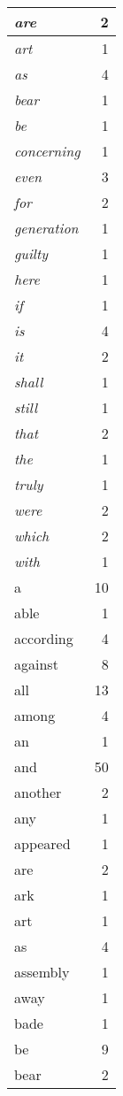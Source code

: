 \begin{center}
\begin{longtable}{l|r}
\emph{are} & 2 \\ \hline
\emph{art} & 1 \\ \hline
\emph{as} & 4 \\ \hline
\emph{bear} & 1 \\ \hline
\emph{be} & 1 \\ \hline
\emph{concerning} & 1 \\ \hline
\emph{even} & 3 \\ \hline
\emph{for} & 2 \\ \hline
\emph{generation} & 1 \\ \hline
\emph{guilty} & 1 \\ \hline
\emph{here} & 1 \\ \hline
\emph{if} & 1 \\ \hline
\emph{is} & 4 \\ \hline
\emph{it} & 2 \\ \hline
\emph{shall} & 1 \\ \hline
\emph{still} & 1 \\ \hline
\emph{that} & 2 \\ \hline
\emph{the} & 1 \\ \hline
\emph{truly} & 1 \\ \hline
\emph{were} & 2 \\ \hline
\emph{which} & 2 \\ \hline
\emph{with} & 1 \\ \hline
a & 10 \\ \hline
able & 1 \\ \hline
according & 4 \\ \hline
against & 8 \\ \hline
all & 13 \\ \hline
among & 4 \\ \hline
an & 1 \\ \hline
and & 50 \\ \hline
another & 2 \\ \hline
any & 1 \\ \hline
appeared & 1 \\ \hline
are & 2 \\ \hline
ark & 1 \\ \hline
art & 1 \\ \hline
as & 4 \\ \hline
assembly & 1 \\ \hline
away & 1 \\ \hline
bade & 1 \\ \hline
be & 9 \\ \hline
bear & 2 \\ \hline

\end{longtable}
\end{center}
